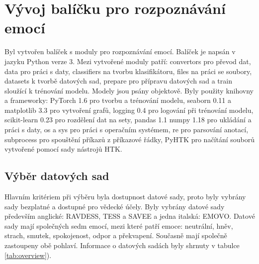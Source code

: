 \documentclass[FM,BP]{tulthesis}
\begin{document}
\chapter{Vývoj balíčku pro rozpoznávání emocí} %
Byl vytvořen balíček s moduly pro rozpoznávání emocí. Balíček je napsán v jazyku Python verze 3. Mezi vytvořené moduly patří: convertors pro převod dat, data pro práci s daty, classifiers na tvorbu klasifikátoru, files na práci se soubory, datasets k tvorbě datových sad, prepare pro přípravu datových sad a train sloužící k trénování modelu. Modely jsou psány objektově. Byly použity knihovny a frameworky: PyTorch 1.6 pro tvorbu a trénování modelu, seaborn 0.11 a matplotlib 3.3 pro vytvoření grafů, logging 0.4 pro logování při trénování modelu, scikit-learn 0.23 pro rozdělení dat na sety, pandas 1.1 numpy 1.18 pro ukládání a práci s daty, os a sys pro práci s operačním systémem, re pro parsování anotací, subprocess pro spouštění příkazů z příkazové řádky, PyHTK pro načítání souborů vytvořené pomocí sady nástrojů HTK.

\section{Výběr datových sad} %
Hlavním kritériem při výběru byla dostupnost datové sady, proto byly vybrány sady bezplatné a dostupné pro vědecké účely. Byly vybrány datové sady především anglické: RAVDESS, TESS a SAVEE a jedna italská: EMOVO. Datové sady mají společných sedm emocí, mezi které patří emoce: neutrální, hněv, strach, smutek, spokojenost, odpor a překvapení. Současně mají společně zastoupeny obě pohlaví. Informace o datových sadách byly shrnuty v tabulce \ref{tab:overview}).

\begin{table}[ht]
\centering
\caption{Přehled vybraných datových sad}
\label{tab:overview}
\end{table}
\FloatBarrier
\end{document}
